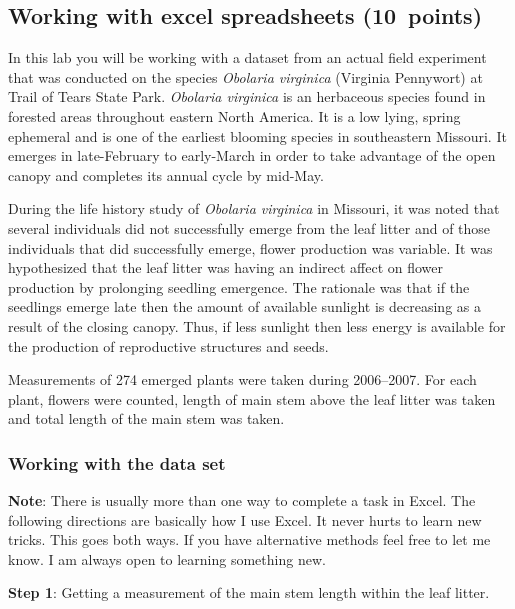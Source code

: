 \documentclass[12pt, hidelinks]{exam}
\newcommand{\hidepoints}{%
	\pointsinmargin\pointformat{}
}
\begin{document}
\hidepoints

\subsection*{Working with excel spreadsheets (10~points)}

In this lab you will be working with a dataset from an actual field
experiment that was conducted on the species \emph{Obolaria virginica}
(Virginia Pennywort) at Trail of Tears State Park. \emph{Obolaria virginica} is
an herbaceous species found in forested areas throughout eastern North
America. It is a low lying, spring ephemeral and is one of the earliest
blooming species in southeastern Missouri. It emerges in late-February
to early-March in order to take advantage of the open canopy and
completes its annual cycle by mid-May.

During the life history study of \emph{Obolaria virginica} in Missouri,
it was noted that several individuals did not successfully emerge from
the leaf litter and of those individuals that did successfully emerge,
flower production was variable. It was hypothesized that the leaf litter
was having an indirect affect on flower production by prolonging
seedling emergence. The rationale was that if the seedlings emerge late
then the amount of available sunlight is decreasing as a result of the
closing canopy. Thus, if less sunlight then less energy is available for
the production of reproductive structures and seeds.

Measurements of 274 emerged plants were taken during 2006–2007. For each
plant, flowers were counted, length of main stem above the leaf litter
was taken and total length of the main stem was taken.

\subsubsection*{Working with the data set}

\textbf{Note}: There is usually more than one way to complete a task in
Excel. The following directions are basically how I use Excel. It never
hurts to learn new tricks. This goes both ways. If you have alternative
methods feel free to let me know. I am always open to learning something
new.

\textbf{Step 1}: Getting a measurement of the main stem length within
the leaf litter.
\end{document}
